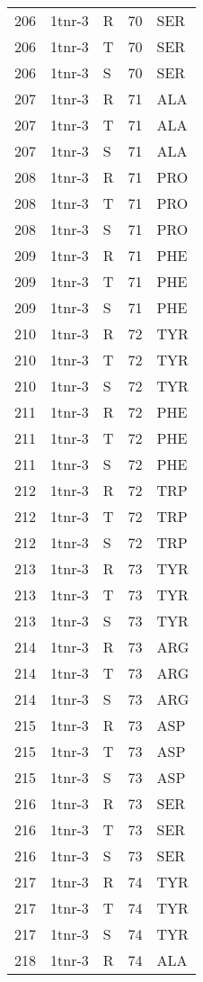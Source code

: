 \begin{longtable}[l]{l|l|l|l|l}
	206 & 1tnr-3 & R & 70 & SER \\
	206 & 1tnr-3 & T & 70 & SER \\
	206 & 1tnr-3 & S & 70 & SER \\
	207 & 1tnr-3 & R & 71 & ALA \\
	207 & 1tnr-3 & T & 71 & ALA \\
	207 & 1tnr-3 & S & 71 & ALA \\
	208 & 1tnr-3 & R & 71 & PRO \\
	208 & 1tnr-3 & T & 71 & PRO \\
	208 & 1tnr-3 & S & 71 & PRO \\
	209 & 1tnr-3 & R & 71 & PHE \\
	209 & 1tnr-3 & T & 71 & PHE \\
	209 & 1tnr-3 & S & 71 & PHE \\
	210 & 1tnr-3 & R & 72 & TYR \\
	210 & 1tnr-3 & T & 72 & TYR \\
	210 & 1tnr-3 & S & 72 & TYR \\
	211 & 1tnr-3 & R & 72 & PHE \\
	211 & 1tnr-3 & T & 72 & PHE \\
	211 & 1tnr-3 & S & 72 & PHE \\
	212 & 1tnr-3 & R & 72 & TRP \\
	212 & 1tnr-3 & T & 72 & TRP \\
	212 & 1tnr-3 & S & 72 & TRP \\
	213 & 1tnr-3 & R & 73 & TYR \\
	213 & 1tnr-3 & T & 73 & TYR \\
	213 & 1tnr-3 & S & 73 & TYR \\
	214 & 1tnr-3 & R & 73 & ARG \\
	214 & 1tnr-3 & T & 73 & ARG \\
	214 & 1tnr-3 & S & 73 & ARG \\
	215 & 1tnr-3 & R & 73 & ASP \\
	215 & 1tnr-3 & T & 73 & ASP \\
	215 & 1tnr-3 & S & 73 & ASP \\
	216 & 1tnr-3 & R & 73 & SER \\
	216 & 1tnr-3 & T & 73 & SER \\
	216 & 1tnr-3 & S & 73 & SER \\
	217 & 1tnr-3 & R & 74 & TYR \\
	217 & 1tnr-3 & T & 74 & TYR \\
	217 & 1tnr-3 & S & 74 & TYR \\
	218 & 1tnr-3 & R & 74 & ALA \\

\end{longtable}
